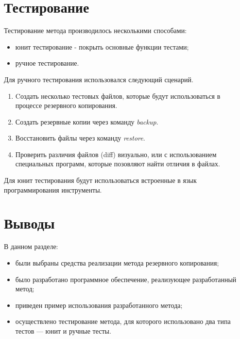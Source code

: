 \section{Тестирование}

\begin{flushleft}
Тестирование метода производилось несколькими способами:
\end{flushleft}

\begin{itemize}
\item юнит тестирование - покрыть основные функции тестами;
\item ручное тестирование.
\end{itemize}

\begin{flushleft}
Для ручного тестирования использовался следующий сценарий.
\end{flushleft}
\begin{enumerate}
\item Cоздать несколько тестовых файлов, которые будут использоваться в процессе резервного копирования.
\item Создать резервные копии через команду \textit{backup}.
\item Восстановить файлы через команду \textit{restore}.
\item Проверить различия файлов (diff) визуально, или с использованием специальных программ, которые позовляют найти отличия в файлах.
\end{enumerate}

Для юнит тестирования будут использоваться встроенные в язык программирования инструменты.  

\section{Выводы}

\begin{flushleft}
В данном разделе:
\end{flushleft}
\begin{itemize}
\item были выбраны средства реализации метода резервного копирования;
\item было разработано программное обеспечение, реализующее разработанный метод;
\item приведен пример использования разработанного метода;
\item осуществлено тестирование метода, для которого использовано два типа тестов --- юнит и ручные тесты.
\end{itemize}




